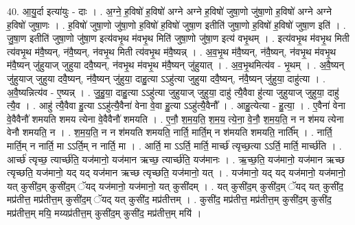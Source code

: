 \documentclass[17pt]{extarticle}
\begin{document}
40. आ॒यु॒र्दा इत्या॑युः - दाः । . अ॒ग्ने॒ ह॒विषो॑ ह॒विषो॑ अग्ने अग्ने ह॒विषो॑ जुषा॒णो जु॑षा॒णो ह॒विषो॑ अग्ने अग्ने ह॒विषो॑ जुषा॒णः । . ह॒विषो॑ जुषा॒णो जु॑षा॒णो ह॒विषो॑ ह॒विषो॑ जुषा॒ण इतीति॑ जुषा॒णो ह॒विषो॑ ह॒विषो॑ जुषा॒ण इति॑ । . जु॒षा॒ण इतीति॑ जुषा॒णो जु॑षा॒ण इत्य॑वभृ॒थ म॑वभृ॒थ मिति॑ जुषा॒णो जु॑षा॒ण इत्य॑ वभृ॒थम् । . इत्य॑वभृ॒थ म॑वभृ॒थ मिती त्य॑वभृ॒थ म॑वै॒ष्यन्, न॑वै॒ष्यन्, न॑वभृ॒थ मिती त्य॑वभृ॒थ म॑वै॒ष्यन्न् । . अ॒व॒भृ॒थ म॑वै॒ष्यन्, न॑वै॒ष्यन्, न॑वभृ॒थ म॑वभृ॒थ म॑वै॒ष्यन् जु॑हुयाज् जुहुया दवै॒ष्यन्, न॑वभृ॒थ म॑वभृ॒थ म॑वै॒ष्यन् जु॑हुयात् । . अ॒व॒भृ॒थमित्य॑व - भृ॒थम् । . अ॒वै॒ष्यन् जु॑हुयाज् जुहुया दवै॒ष्यन्, न॑वै॒ष्यन् जु॑हुया॒ दाहु॒त्या ऽऽहु॑त्या जुहुया दवै॒ष्यन्, न॑वै॒ष्यन् जु॑हुया॒ दाहु॑त्या । . अ॒वै॒ष्यन्नित्य॑व - ए॒ष्यन्न् । . जु॒हु॒या॒ दाहु॒त्या ऽऽहु॑त्या जुहुयाज् जुहुया॒ दाहु॑ त्यै॒वैवा हु॑त्या जुहुयाज् जुहुया॒ दाहु॑ त्यै॒व । . आहु॑ त्यै॒वैवा हु॒त्या ऽऽहु॑त्यै॒वैना॑ वेना वे॒वा हु॒त्या ऽऽहु॑त्यै॒वैनौ᳚ । . आहु॒त्येत्या - हु॒त्या॒ । . ए॒वैना॑ वेना वे॒वैवैनौ॑ शमयति शमय त्येना वे॒वैवैनौ॑ शमयति । . ए॒नौ॒ श॒म॒य॒ति॒ श॒म॒य॒ त्ये॒ना॒ वे॒नौ॒ श॒म॒य॒ति॒ न न श॑मय त्येना वेनौ शमयति॒ न । . श॒म॒य॒ति॒ न न श॑मयति शमयति॒ नार्ति॒ मार्ति॒म् न श॑मयति शमयति॒ नार्ति᳚म् । . नार्ति॒ मार्ति॒म् न नार्ति॒ मा ऽऽर्ति॒म् न नार्ति॒ मा । . आर्ति॒ मा ऽऽर्ति॒ मार्ति॒ मार्च्छ॑ त्यृच्छ॒त्या ऽऽर्ति॒ मार्ति॒ मार्च्छ॑ति । . आर्च्छ॑ त्यृच्छ॒ त्यार्च्छ॑ति॒ यज॑मानो॒ यज॑मान ऋच्छ॒ त्यार्च्छ॑ति॒ यज॑मानः । . ऋ॒च्छ॒ति॒ यज॑मानो॒ यज॑मान ऋच्छ त्यृच्छति॒ यज॑मानो॒ यद् यद् यज॑मान ऋच्छ त्यृच्छति॒ यज॑मानो॒ यत् । . यज॑मानो॒ यद् यद् यज॑मानो॒ यज॑मानो॒ यत् कुसी॑द॒म् कुसी॑द॒म् ॅयद् यज॑मानो॒ यज॑मानो॒ यत् कुसी॑दम् । . यत् कुसी॑द॒म् कुसी॑द॒म् ॅयद् यत् कुसी॑द॒ मप्र॑तीत्त॒ मप्र॑तीत्त॒म् कुसी॑द॒म् ॅयद् यत् कुसी॑द॒ मप्र॑तीत्तम् । . कुसी॑द॒ मप्र॑तीत्त॒ मप्र॑तीत्त॒म् कुसी॑द॒म् कुसी॑द॒ मप्र॑तीत्त॒म् मयि॒ मय्यप्र॑तीत्त॒म् कुसी॑द॒म् कुसी॑द॒ मप्र॑तीत्त॒म् मयि॑ । \newline
\pagebreak
{}
\end{document}
